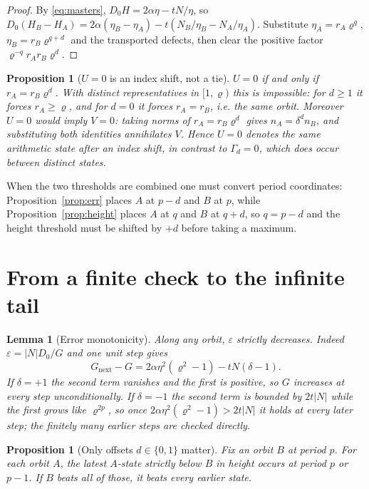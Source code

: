 \documentclass[11pt]{article}
\newtheorem{proposition}[theorem]{Proposition}
\newtheorem{lemma}[theorem]{Lemma}
\theoremstyle{definition}
\theoremstyle{remark}
\newcommand{\pr}{\varrho}
\newcommand{\gam}{\Gamma}
\begin{document}
\begin{proof}
By \eqref{eq:masters}, $D_0H=2\alpha\eta-tN/\eta$, so
$D_0(H_B-H_A)=2\alpha(\eta_B-\eta_A)-t(N_B/\eta_B-N_A/\eta_A)$. Substitute
$\eta_A=r_A\pr^{q}$, $\eta_B=r_B\pr^{q+d}$ and the transported defects, then clear the positive
factor $\pr^{-q}r_Ar_B\pr^{d}$.
\end{proof}

\begin{proposition}[$U=0$ is an index shift, not a tie]\label{prop:U0}
$U=0$ if and only if $r_A=r_B\pr^{d}$. With distinct representatives in $[1,\pr)$ this is
impossible: for $d\ge1$ it forces $r_A\ge\pr$, and for $d=0$ it forces $r_A=r_B$, i.e. the same
orbit. Moreover $U=0$ would imply $V=0$: taking norms of $r_A=r_B\pr^d$ gives
$n_A=\delta^dn_B$, and substituting both identities annihilates $V$. Hence $U=0$ denotes the
same arithmetic state after an index shift, in contrast to $\gam_d=0$, which does occur between
distinct states.
\end{proposition}

When the two thresholds are combined one must convert period coordinates:
Proposition~\ref{prop:err} places $A$ at $p-d$ and $B$ at $p$, while
Proposition~\ref{prop:height} places $A$ at $q$ and $B$ at $q+d$, so $q=p-d$ and the height
threshold must be shifted by $+d$ before taking a maximum.

\section{From a finite check to the infinite tail}\label{sec:tail}

\begin{lemma}[Error monotonicity]\label{lem:mono}
Along any orbit, $\varepsilon$ strictly decreases. Indeed $\varepsilon=|N|D_0/G$ and one unit
step gives
\begin{equation}\label{eq:Ginc}
G_{\mathrm{next}}-G=2\alpha\eta^2(\pr^2-1)-tN(\delta-1).
\end{equation}
If $\delta=+1$ the second term vanishes and the first is positive, so $G$ increases at every
step unconditionally. If $\delta=-1$ the second term is bounded by $2t|N|$ while the first grows
like $\pr^{2p}$, so once $2\alpha\eta^2(\pr^2-1)>2t|N|$ it holds at every later step; the
finitely many earlier steps are checked directly.
\end{lemma}

\begin{proposition}[Only offsets $d\in\{0,1\}$ matter]\label{prop:window}
Fix an orbit $B$ at period $p$. For each orbit $A$, the latest $A$-state strictly below $B$ in
height occurs at period $p$ or $p-1$. If $B$ beats all of those, it beats every earlier state.
\end{proposition}
\end{document}
